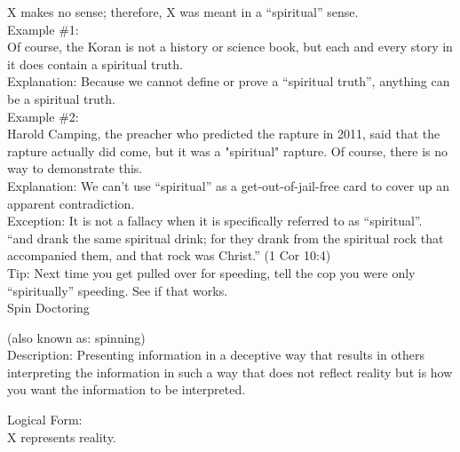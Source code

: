 \documentclass[a4paper,12pt,single,pdftex]{scrartcl}
\begin{document}
    
      X makes no sense; therefore, X was meant in a “spiritual” sense.
    \\

    
      Example \#1:
    \\

    
      Of course, the Koran is not a history or science book, but each and every story in it does contain a spiritual truth.
    \\

    
      Explanation: Because we cannot define or prove a “spiritual truth”, anything can be a spiritual truth.
    \\

    
      Example \#2:
    \\

    
      Harold Camping, the preacher who predicted the rapture in 2011, said that the rapture actually did come, but it was a "spiritual" rapture.  Of course, there is no way to demonstrate this.
    \\

    
      Explanation: We can’t use “spiritual” as a get-out-of-jail-free card to cover up an apparent contradiction.
    \\

    
      Exception: It is not a fallacy when it is specifically referred to as “spiritual”.
    \\

    
      “and drank the same spiritual drink; for they drank from the spiritual rock that accompanied them, and that rock was Christ.” (1 Cor 10:4)
    \\

    
      Tip: Next time you get pulled over for speeding, tell the cop you were only “spiritually” speeding. See if that works.
    \\

  

Spin Doctoring
    
      (also known as: spinning)
    \\

  
    Description: Presenting information in a deceptive way that results in others interpreting the information in such a way that does not reflect reality but is how you want the information to be interpreted.

    
      Logical Form:
    \\

    
      X represents reality.
    \\
\end{document}
